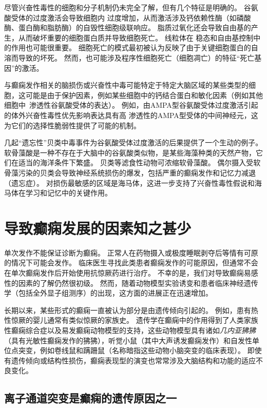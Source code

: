 尽管兴奋性毒性的细胞和分子机制仍未完全了解，但有几个特征是明确的。
谷氨酸受体的过度激活会导致细胞内  过度增加，从而激活涉及钙依赖性酶（如磷酸酶、蛋白酶和脂肪酶）的自毁性细胞级联响应。
脂质过氧化还会导致自由基的产生，从而破坏重要的细胞蛋白质并导致细胞死亡。
线粒体在  稳态和自由基控制中的作用也可能很重要。
细胞死亡的模式最初被认为反映了由于关键细胞蛋白的自溶而导致的坏死。
然而，也可能涉及程序性细胞死亡（细胞凋亡）的特征“死亡基因”的激活。


与癫痫发作相关的脑损伤或兴奋性中毒可能特定于特定大脑区域的某些类型的细胞，这可能是由于保护因素，例如某些细胞中的钙结合蛋白和敏化因素（例如其他细胞中~渗透性谷氨酸受体的表达）。
例如，由AMPA型谷氨酸受体过度激活引起的体外兴奋性毒性优先影响表达具有高  渗透性的AMPA型受体的中间神经元，这为它们的选择性脆弱性提供了可能的机制。


几起“遗忘性”贝类中毒事件为谷氨酸受体过度激活的后果提供了一个生动的例子。
软骨藻酸是一种不存在于大脑中的谷氨酸类似物，是某些海藻种类的天然产物，它们在适当的海洋条件下繁盛。
贝类等滤食性动物可浓缩软骨藻酸。
偶尔摄入受软骨藻污染的贝类会导致神经系统损伤的爆发，包括严重的癫痫发作和记忆力减退（遗忘症）。
对损伤最敏感的区域是海马体，这进一步支持了兴奋性毒性假说和海马体在学习和记忆中的关键作用。



\section{导致癫痫发展的因素知之甚少}

单次发作不能保证诊断为癫痫。
正常人在药物摄入或极度睡眠剥夺后等情有可原的情况下可能会发作。
临床医生寻找此类患者癫痫发作的可能原因，但通常不会在单次癫痫发作后开始使用抗惊厥药进行治疗。
不幸的是，我们对导致癫痫易感性的因素的了解仍然很初级。
然而，随着动物模型实验诱变和患者临床神经遗传学（包括全外显子组测序）的出现，这方面的进展正在迅速增加。


长期以来，某些形式的癫痫一直被认为部分是由遗传倾向引起的。
例如，患有热性惊厥的婴儿通常有类似惊厥的家族史。
遗传学在癫痫中的作用得到了人类家族性癫痫综合症以及易发癫痫动物模型的支持，这些动物模型具有诸如\textit{几内亚狒狒}（具有光敏性癫痫发作的狒狒），听觉小鼠（其中大声诱发癫痫发作）和自发性单位点突变，例如卷线鼠和蹒跚鼠（名称暗指这些动物小脑突变的临床表现）。
即使有遗传倾向或结构性损伤，癫痫表现型的演变也常常涉及大脑结构和功能的适应不良变化。



\subsection{离子通道突变是癫痫的遗传原因之一}


